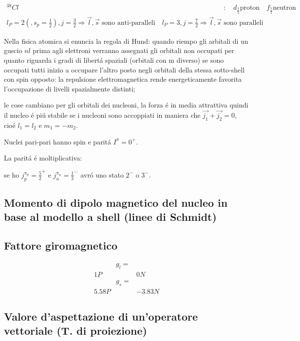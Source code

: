 \documentclass[main.tex]{subfiles}
\begin{document}
\begin{align*}
^{38}{Cl}&:\quad d_{\frac{3}{2}} \text{proton}\quad f_{\frac{7}{2}} \text{neutron}\\
l_P=2 (, s_p=\frac{1}{2}), j=\frac{3}{2} \Rightarrow \vec{l},  \vec{s} \text{ sono anti-paralleli}\quad l_P=3, j=\frac{7}{2} \Rightarrow \vec{l}, \vec{s} \text{ sono paralleli}
\end{align*}


Nella fisica atomica si enuncia la regola di Hund: quando riempo gli arbitali di un guscio $nl$ prima agli elettroni verranno assegnati gli orbitali non occupati per quanto riguarda i gradi di libert\'a spaziali (orbitali con m diverso) se sono occupati tutti inizio a occupare l'altro posto negli orbitali della stessa sotto-shell con spin opposto: la repulsione elettromagnetica rende energeticamente favorita l'occupazione di livelli spazialmente distinti;

le cose cambiano per gli orbitali dei nucleoni, la forza \'e in media attrattiva quindi il nucleo \'e pi\'u stabile se i nucleoni sono accoppiati in maniera che $\vec{j_1}+\vec{j_2}=0$, cio\'e $l_1=l_2$ e $m_1=-m_2$.

Nuclei pari-pari hanno spin e parit\'a $I^{\pi}=0^+$.

La parit\'a \'e moltiplicativa:

se ho $j_p^{\pi_p}=\frac{5}{2}^+$ e $j_n^{\pi_n}=\frac{1}{2}^-$ avr\'o uno stato $2^-$ o $3^-$.



\subsection{Momento di dipolo magnetico del nucleo in base al modello a shell (linee di Schmidt)}

\subsection{Fattore giromagnetico}
\begin{align*}
&&g_l=&&\\
&1 P&&0N&\\
&&g_s=&&\\
&5.58 P &&-3.83 N&
\end{align*}

\subsection{Valore d'aspettazione di un'operatore vettoriale (T. di proiezione)}
\end{document}

